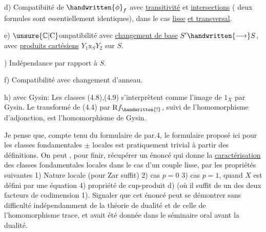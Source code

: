  d) Compatibiité de $\handwritten{\phi}_f$ avec \uline{transitivité} et \uline{intersections} ( deux formules sont essentiellement identiques), dans le cas \uline{lisse}\handwritten{\unsure{,|;}}
\uline{et transversal}.

 e) $\unsure{\mathbb{C}|\mathrm{C}}$ompatibilité avec \uline{changement de base} $S'\handwritten{\longrightarrow}S$, avec \uline{produits cartésiens} $Y_1\mathbin{\mathrm{x}}_S Y_2$ sur $S$.

) Indépendance par rapport à $S$. 

 f) Compatibilité avec changement d'anneau.

 h)  avec Gysin: Les classes (4.8),(4.9) s'interprètent comme l'image de $1_X$ par Gysin. Le transformé de (4.4) par $\mathrm{R}f_{\handwritten{!}}$, suivi de l'homomorphisme d'adjonction, est l'homomorphisme de Gysin.

Je pense que, compte tenu du formulaire de par.4, le formulaire  proposé ici pour les classes fondamentales $\pm$ locales est pratiquement trivial à partir des définitions. On peut , pour finir, récupérer un énoncé qui donne la \uline{caractérisation} des classes fondamentales locales dans le cas d'un couple lisse, par les propriétés suivantes 1) Nature locale (pour Zar suffit) 2) cas $p=0$ 3) cas $p=1$, quand $X$ est défini par une équation 4) propriété de cup-produit d) (où il suffit de  un des deux facteurs de codimension 1). Signaler que cet énoncé\deleted{\unsure{,}} peut se démontrer sans difficulté indépendamment de la théorie de dualité et de celle de l'homomorphisme trace, et avait été donnée dans le séminaire oral  avant la dualité.

